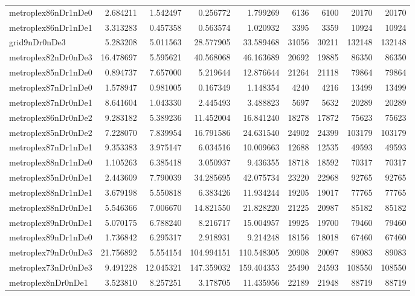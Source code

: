 \begin{longtable}{|l|r|r|r|r|r|r|r|r|}
metroplex86nDr1nDe0 & 2.684211 & 1.542497 & 0.256772 & 1.799269 & 6136 & 6100 & 20170 & 20170 \\
metroplex86nDr1nDe1 & 3.313283 & 0.457358 & 0.563574 & 1.020932 & 3395 & 3359 & 10924 & 10924 \\
grid9nDr0nDe3 & 5.283208 & 5.011563 & 28.577905 & 33.589468 & 31056 & 30211 & 132148 & 132148 \\
metroplex82nDr0nDe3 & 16.478697 & 5.595621 & 40.568068 & 46.163689 & 20692 & 19885 & 86350 & 86350 \\
metroplex85nDr1nDe0 & 0.894737 & 7.657000 & 5.219644 & 12.876644 & 21264 & 21118 & 79864 & 79864 \\
metroplex87nDr1nDe0 & 1.578947 & 0.981005 & 0.167349 & 1.148354 & 4240 & 4216 & 13499 & 13499 \\
metroplex87nDr0nDe1 & 8.641604 & 1.043330 & 2.445493 & 3.488823 & 5697 & 5632 & 20289 & 20289 \\
metroplex86nDr0nDe2 & 9.283182 & 5.389236 & 11.452004 & 16.841240 & 18278 & 17872 & 75623 & 75623 \\
metroplex85nDr0nDe2 & 7.228070 & 7.839954 & 16.791586 & 24.631540 & 24902 & 24399 & 103179 & 103179 \\
metroplex87nDr1nDe1 & 9.353383 & 3.975147 & 6.034516 & 10.009663 & 12688 & 12535 & 49593 & 49593 \\
metroplex88nDr1nDe0 & 1.105263 & 6.385418 & 3.050937 & 9.436355 & 18718 & 18592 & 70317 & 70317 \\
metroplex85nDr0nDe1 & 2.443609 & 7.790039 & 34.285695 & 42.075734 & 23220 & 22968 & 92765 & 92765 \\
metroplex88nDr1nDe1 & 3.679198 & 5.550818 & 6.383426 & 11.934244 & 19205 & 19017 & 77765 & 77765 \\
metroplex88nDr0nDe1 & 5.546366 & 7.006670 & 14.821550 & 21.828220 & 21225 & 20987 & 85182 & 85182 \\
metroplex89nDr0nDe1 & 5.070175 & 6.788240 & 8.216717 & 15.004957 & 19925 & 19700 & 79460 & 79460 \\
metroplex89nDr1nDe0 & 1.736842 & 6.295317 & 2.918931 & 9.214248 & 18156 & 18018 & 67460 & 67460 \\
metroplex79nDr0nDe3 & 21.756892 & 5.554154 & 104.994151 & 110.548305 & 20908 & 20097 & 89083 & 89083 \\
metroplex73nDr0nDe3 & 9.491228 & 12.045321 & 147.359032 & 159.404353 & 25490 & 24593 & 108550 & 108550 \\
metroplex8nDr0nDe1 & 3.523810 & 8.257251 & 3.178705 & 11.435956 & 22189 & 21948 & 88719 & 88719 \\

\end{longtable}
